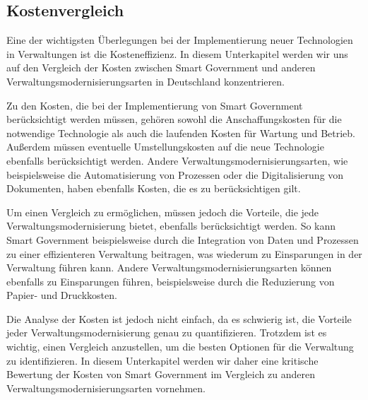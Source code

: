 \subsection{Kostenvergleich}
Eine der wichtigsten Überlegungen bei der Implementierung neuer Technologien in Verwaltungen ist die Kosteneffizienz. 
In diesem Unterkapitel werden wir uns auf den Vergleich der Kosten zwischen Smart Government und anderen Verwaltungsmodernisierungsarten in Deutschland konzentrieren.
\par
Zu den Kosten, die bei der Implementierung von Smart Government berücksichtigt werden müssen, gehören sowohl die Anschaffungskosten für die notwendige Technologie als auch die laufenden Kosten für Wartung und Betrieb. 
Außerdem müssen eventuelle Umstellungskosten auf die neue Technologie ebenfalls berücksichtigt werden. 
Andere Verwaltungsmodernisierungsarten, wie beispielsweise die Automatisierung von Prozessen oder die Digitalisierung von Dokumenten, haben ebenfalls Kosten, die es zu berücksichtigen gilt.
\par
Um einen Vergleich zu ermöglichen, müssen jedoch die Vorteile, die jede Verwaltungsmodernisierung bietet, ebenfalls berücksichtigt werden. 
So kann Smart Government beispielsweise durch die Integration von Daten und Prozessen zu einer effizienteren Verwaltung beitragen, was wiederum zu Einsparungen in der Verwaltung führen kann. 
Andere Verwaltungsmodernisierungsarten können ebenfalls zu Einsparungen führen, beispielsweise durch die Reduzierung von Papier- und Druckkosten.
\par
Die Analyse der Kosten ist jedoch nicht einfach, da es schwierig ist, die Vorteile jeder Verwaltungsmodernisierung genau zu quantifizieren. 
Trotzdem ist es wichtig, einen Vergleich anzustellen, um die besten Optionen für die Verwaltung zu identifizieren. 
In diesem Unterkapitel werden wir daher eine kritische Bewertung der Kosten von Smart Government im Vergleich zu anderen Verwaltungsmodernisierungsarten vornehmen.